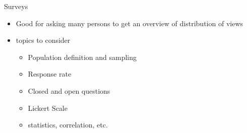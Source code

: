 \begin{Slide}{Surveys}
\begin{itemize}
\item Good for asking many persons to get an overview of distribution of views
\item \TODO topics to consider
\begin{itemize}
\item Population definition and sampling
\item Response rate
\item Closed and open questions
\item Lickert Scale
\item statistics, correlation, etc.


\end{itemize}
\end{itemize}
\end{Slide}
